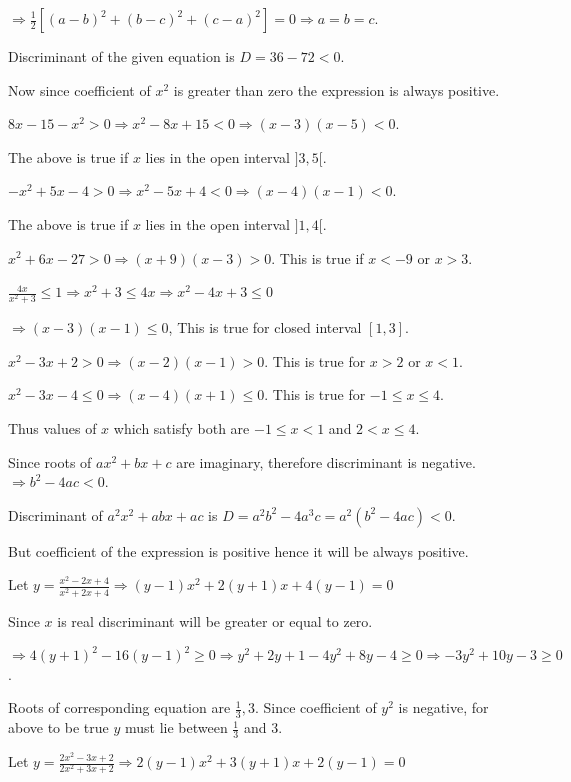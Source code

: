   $\Rightarrow \frac{1}{2}\left[(a - b)^2 + (b - c)^2 + (c - a)^2\right] = 0\Rightarrow a = b = c$.
\item Discriminant of the given equation is $D = 36 - 72 < 0$.

  Now since coefficient of $x^2$ is greater than zero the expression is always positive.
\item $8x - 15 - x^2 > 0\Rightarrow x^2 - 8x + 15 < 0 \Rightarrow (x - 3)(x - 5) < 0$.

  The above is true if $x$ lies in the open interval $]3, 5[$.
\item $-x^2 + 5x - 4 > 0\Rightarrow x^2 - 5x + 4 < 0\Rightarrow (x - 4)(x - 1) < 0$.

  The above is true if $x$ lies in the open interval $]1, 4[$.
\item $x^2 + 6x - 27 > 0\Rightarrow (x + 9)(x - 3) > 0$. This is true if $x < -9$ or $x > 3$.
\item $\frac{4x}{x^2 + 3} \le 1 \Rightarrow x^2 + 3 \le 4x\Rightarrow x^2 - 4x + 3 \le 0$

  $\Rightarrow (x - 3)(x - 1) \le 0$, This is true for closed interval $[1, 3]$.
\item $x^2 - 3x + 2 > 0\Rightarrow (x - 2)(x - 1) > 0$. This is true for $x > 2$ or $x < 1$.

  $x^2 - 3x - 4 \le 0\Rightarrow (x - 4)(x + 1) \le 0$. This is true for $-1 \le x \le 4$.

  Thus values of $x$ which satisfy both are $-1 \le x < 1$ and $2 < x \le 4$.
\item Since roots of $ax^2 + bx + c$ are imaginary, therefore discriminant is negative. $\Rightarrow b^2 -
  4ac < 0$.

  Discriminant of $a^2x^2 + abx + ac$ is $D = a^2b^2 - 4a^3c = a^2(b^2 - 4ac) < 0$.

  But coefficient of the expression is positive hence it will be always positive.
\item Let $y = \frac{x^2 - 2x + 4}{x^2 + 2x + 4}\Rightarrow (y - 1)x^2 + 2(y + 1)x + 4(y - 1) = 0$

  Since $x$ is real discriminant will be greater or equal to zero.

  $\Rightarrow 4(y + 1)^2 - 16(y - 1)^2 \ge 0\Rightarrow y^2 + 2y + 1 - 4y^2 + 8y - 4 \ge 0\Rightarrow -3y^2
  + 10y - 3 \ge 0$.

  Roots of corresponding equation are $\frac{1}{3}, 3$. Since coefficient of $y^2$ is negative, for above to be true
  $y$ must lie between $\frac{1}{3}$ and $3$.
\item Let $y = \frac{2x^2 - 3x + 2}{2x^2 + 3x + 2}\Rightarrow 2(y - 1)x^2 + 3(y + 1)x + 2(y - 1) = 0$


